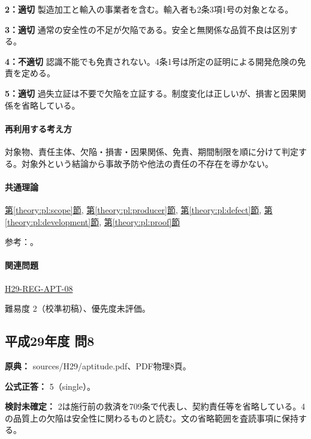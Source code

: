 \noindent\textbf{2：適切} 製造加工と輸入の事業者を含む。輸入者も2条3項1号の対象となる。\par

\noindent\textbf{3：適切} 通常の安全性の不足が欠陥である。安全と無関係な品質不良は区別する。\par

\noindent\textbf{4：不適切} 認識不能でも免責されない。4条1号は所定の証明による開発危険の免責を定める。\par

\noindent\textbf{5：適切} 過失立証は不要で欠陥を立証する。制度変化は正しいが、損害と因果関係を省略している。\par

\paragraph{再利用する考え方} 対象物、責任主体、欠陥・損害・因果関係、免責、期間制限を順に分けて判定する。対象外という結論から事故予防や他法の責任の不存在を導かない。

\paragraph{共通理論} \hyperref[theory:pl:scope]{第\ref*{theory:pl:scope}節}, \hyperref[theory:pl:producer]{第\ref*{theory:pl:producer}節}, \hyperref[theory:pl:defect]{第\ref*{theory:pl:defect}節}, \hyperref[theory:pl:development]{第\ref*{theory:pl:development}節}, \hyperref[theory:pl:proof]{第\ref*{theory:pl:proof}節}

\par 参考：\cite{pl_statute,pl_qa,pl_definitions2018}。

\paragraph{関連問題} \hyperref[q:h29-reg-apt-08]{H29-REG-APT-08}

\par 難易度 2（校準初稿）、優先度未評価。

\subsection{平成29年度 問8}
\label{q:h29-reg-apt-08}

\noindent\textbf{原典：} sources/H29/aptitude.pdf、PDF物理8頁。

\textbf{公式正答：} 5（single）。

\par\textbf{検討未確定：} 2は施行前の救済を709条で代表し、契約責任等を省略している。4の品質上の欠陥は安全性に関わるものと読む。文の省略範囲を査読事項に保持する。

